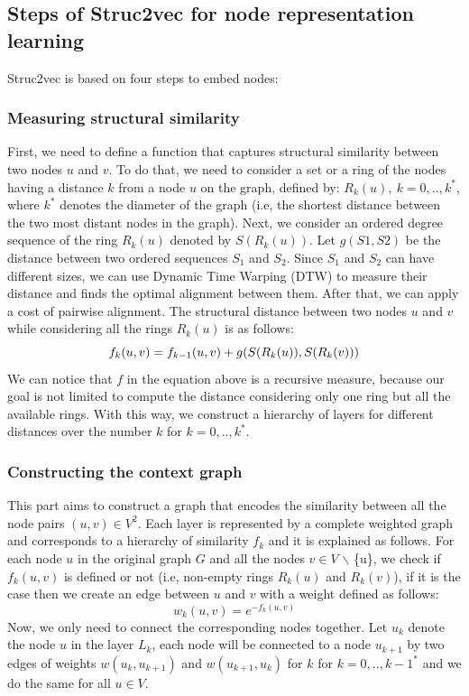 \documentclass[a4paper,13pt]{article}
\begin{document}
\subsection{Steps of Struc2vec for node representation learning}
Struc2vec is based on four steps to embed nodes:
\subsubsection{Measuring structural similarity}
First, we need to define a function that captures structural similarity between two nodes $u$ and $v$.
To do that, we need to consider a set or a ring of the nodes having a distance $k$ from a node $u$ on the graph, defined by:
$R_{k}(u),\ k= 0, .., k^*$, where $k^*$ denotes the diameter of the graph (i.e, the shortest distance between the two most distant nodes in the graph).
Next, we consider an ordered degree sequence of the ring $R_{k}(u)$ denoted by $S(R_{k}(u))$.
Let $g(S1,S2)$ be the distance between two ordered sequences $S_1$ and $S_2$. Since $S_1$ and $S_2$ can have different sizes, we can use Dynamic Time Warping (DTW) to measure their distance and finds the optimal alignment between them. After that, we can apply a cost of pairwise alignment.
The structural distance between two nodes $u$ and $v$ while considering all the rings $R_{k}(u)$ is as follows:
 \begin{equation*}
      f_{k}(u,v) = f_{k-1}(u,v) + g(S(R_{k}(u)),S(R_{k}(v)))
      \label{eq:f_{k}(u,v)}
 \end{equation*}
We can notice that $f$ in the equation above is a recursive measure, because our goal is not limited to compute the distance considering only one ring but all the available rings. With this way, we construct a hierarchy of layers for different distances over the number $k$ for $k= 0, .., k^*$.
\subsubsection{Constructing the context graph}
This part aims to construct a graph that encodes the similarity between all the node pairs $(u,v) \in V^2$. Each layer is represented by a complete weighted graph and corresponds to a hierarchy of similarity $f_{k}$ and it is explained as follows. For each node $u$ in the original graph $G$ and all the nodes $v \in V$ $\backslash$ \{u\}, we check if $f_{k}(u,v)$ is defined or not (i.e, non-empty rings $R_{k}(u)$ and $R_{k}(v)$), if it is the case then we create an edge between $u$ and $v$ with a weight defined as follows: 
\begin{equation*}
w_{k}(u,v) = e^{-f_{k}(u,v)}
\end{equation*}
Now, we only need to connect the corresponding nodes together. Let $u_{k}$ denote the node $u$ in the layer $L_{k}$, each node will be connected to a node $u_{k+1}$ by two edges of weights $w(u_{k},u_{k+1})$ and $w(u_{k+1},u_{k})$ for $k$ for $k= 0, .., k-1^*$ and we do the same for all $u \in V$.
\end{document}
